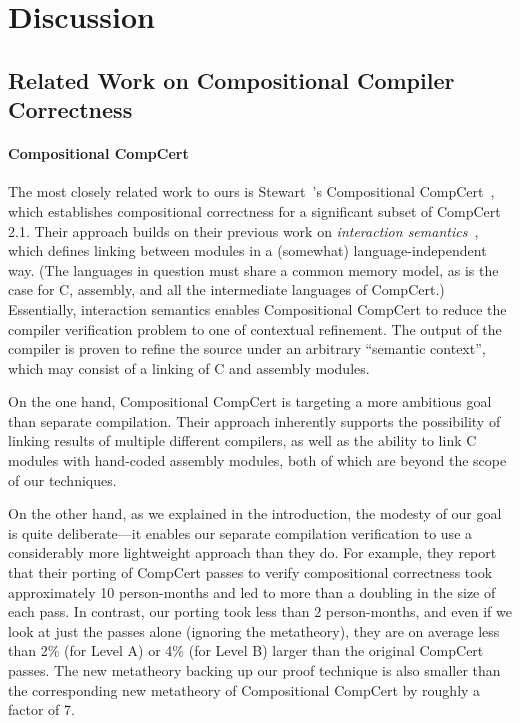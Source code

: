 \section{Discussion}
\label{sec:sepcomp:discussion}





\subsection{Related Work on Compositional Compiler Correctness}

\paragraph{Compositional CompCert}

The most closely related work to ours is Stewart~\etal's Compositional
CompCert~\cite{stewart+:popl2015}, which establishes compositional correctness for a
significant subset of CompCert 2.1.  Their approach builds on their
previous work on \emph{interaction semantics}~\cite{beringer+:esop14}, which defines
linking between modules in a (somewhat) language-independent way.
(The languages in question must share a common memory model, as is the
case for C, assembly, and all the intermediate languages of CompCert.)
Essentially, interaction semantics enables Compositional CompCert to
reduce the compiler verification problem to one of contextual
refinement.  The output of the compiler is proven to refine the source
under an arbitrary ``semantic context'', which may consist of a
linking of C and assembly modules.

On the one hand, Compositional CompCert is targeting a more ambitious
goal than separate compilation.  Their approach inherently supports the
possibility of linking results of multiple different compilers, as
well as the ability to link C modules with hand-coded assembly
modules, both of which are beyond the scope of our techniques.

On the other hand, as we explained in the introduction, the modesty of
our goal is quite deliberate---it enables our separate compilation verification
to use a considerably more lightweight approach than they do.  For
example, they report that their porting of CompCert passes to verify
compositional correctness took approximately 10 person-months and led
to more than a doubling in the size of each pass.  In contrast, our
porting took less than 2 person-months, and even if we look at just
the passes alone (ignoring the metatheory), they are on average less
than 2\% (for Level A) or 4\% (for Level B) larger than the original
CompCert passes.  The new metatheory backing up our proof technique is
also smaller than the corresponding new metatheory of Compositional
CompCert by roughly a factor of 7.

